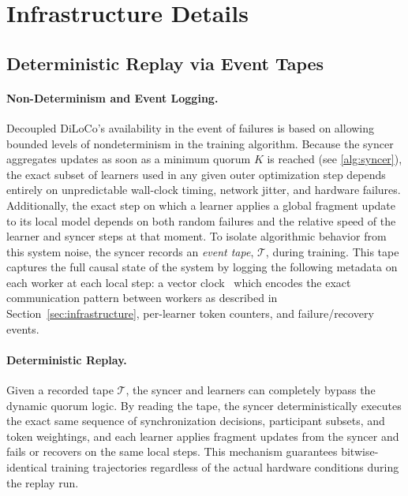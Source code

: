 \documentclass[11pt, a4paper, twocolumn, copyright, google]{google}
\begin{document}
\section{Infrastructure Details}

\subsection{Deterministic Replay via Event Tapes}\label{sec:tape_generation}


\paragraph{Non-Determinism and Event Logging.}
Decoupled DiLoCo's availability in the event of failures is based on allowing bounded levels of nondeterminism in the training algorithm.
Because the syncer aggregates updates as soon as a minimum quorum $K$ is reached (see \autoref{alg:syncer}), the exact subset of learners used in any given outer optimization step depends entirely on unpredictable wall-clock timing, network jitter, and hardware failures. Additionally, the exact step on which a learner applies a global fragment update to its local model depends on both random failures and the relative speed of the learner and syncer steps at that moment.  To isolate algorithmic behavior from this system noise, the syncer records an \emph{event tape}, $\mathcal{T}$, during training. This tape captures the full causal state of the system by logging the following metadata on each worker at each local step: a vector clock~\citep{mattern1989virtual} which encodes the exact communication pattern between workers as described in Section~\ref{sec:infrastructure}, per-learner token counters, and failure/recovery events.

\paragraph{Deterministic Replay.}
Given a recorded tape $\mathcal{T}$, the syncer and learners can completely bypass the dynamic quorum logic. By reading the tape, the syncer deterministically executes the exact same sequence of synchronization decisions, participant subsets, and token weightings, and each learner applies fragment updates from the syncer and fails or recovers on the same local steps. This mechanism guarantees bitwise-identical training trajectories regardless of the actual hardware conditions during the replay run.
\end{document}
